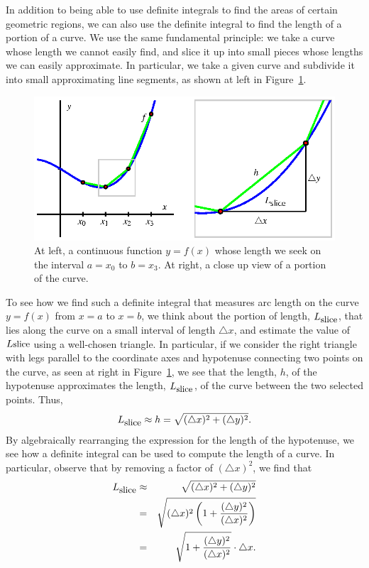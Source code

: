 In addition to being able to use definite integrals to find the areas of certain geometric regions, we can also use the definite integral to find the length of a portion of a curve.  We use the same fundamental principle:  we take a curve whose length we cannot easily find, and slice it up into small pieces whose lengths we can easily approximate.  In particular, we take a given curve and subdivide it into small approximating line segments, as shown at left in Figure~\ref{F:6.1.ArcLength}.  
\begin{figure}[h]
\begin{center}
\includegraphics{figures/6_1_ArcLength.eps}
\caption{At left, a continuous function $y = f(x)$ whose length we seek on the interval $a = x_0$ to $b = x_3$.  At right, a close up view of a portion of the curve.} \label{F:6.1.ArcLength}
\end{center}
\end{figure}
To see how we find such a definite integral that measures arc length on the curve $y = f(x)$ from $x = a$ to $x = b$, we think about the portion of length, $L_{\mbox{\small{slice}}}$, that lies along the curve on a small interval of length $\triangle x$, and estimate the value of $L{\mbox{\small{slice}}}$ using a well-chosen triangle.  In particular, if we consider the right triangle with legs parallel to the coordinate axes and hypotenuse connecting two points on the curve, as seen at right in Figure~\ref{F:6.1.ArcLength}, we see that the length, $h$, of the hypotenuse approximates the length, $L_{\mbox{\small{slice}}}$, of the curve between the two selected points.  Thus,
$$L_{\mbox{\small{slice}}} \approx h = \sqrt{ (\triangle x)^2 + (\triangle y)^2 }.$$
By algebraically rearranging the expression for the length of the hypotenuse, we see how a definite integral can be used to compute the length of a curve.  In particular, observe that by removing a factor of $(\triangle x)^2$, we find that
\begin{eqnarray*}
L_{\mbox{\small{slice}}} & \approx & \sqrt{ (\triangle x)^2 + (\triangle y)^2 } \\
				& = & \sqrt{ (\triangle x)^2\left(1 + \frac{(\triangle y)^2}{(\triangle x)^2} \right)} \\
				& = & \sqrt{1 + \frac{(\triangle y)^2}{(\triangle x)^2} } \cdot \triangle x.
\end{eqnarray*}

